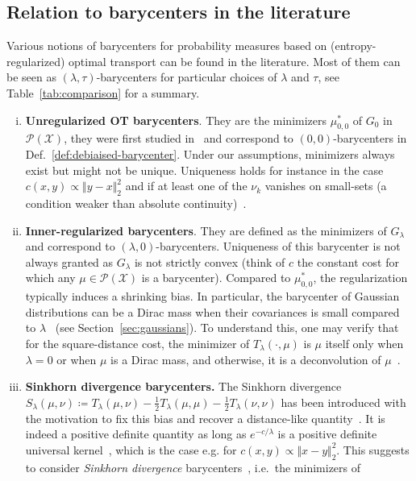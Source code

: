 \documentclass[11pt]{article}
\newcommand{\Pp}{\mathcal{P}}
\newcommand{\Xx}{\mathcal{X}}
\begin{document}
\subsection{Relation to barycenters in the literature}
Various notions of barycenters for probability measures based on (entropy-regularized) optimal transport can be found in the literature. Most of them can be seen as $(\lambda,\tau)$-barycenters for particular choices of $\lambda$ and $\tau$, see Table~\ref{tab:comparison} for a summary.
\begin{enumerate}[(i)]
\item \textbf{Unregularized OT barycenters}. They are the minimizers $\mu_{0,0}^*$ of $G_0$ in $\Pp(\Xx)$, they were first studied in~\cite{agueh2011barycenters} and correspond to $(0,0)$-barycenters in Def.~\ref{def:debiaised-barycenter}. Under our assumptions, minimizers always exist but might not be unique. Uniqueness holds for instance in the case $c(x,y)\propto \Vert y-x\Vert_2^2$ and if at least one of the $\nu_k$ vanishes on small-sets (a condition weaker than absolute continuity)~\cite{agueh2011barycenters}. 
\item \textbf{Inner-regularized barycenters}. They are defined as the minimizers of $G_\lambda$ and correspond to $(\lambda,0)$-barycenters. Uniqueness of this barycenter is not always granted as $G_\lambda$ is not strictly convex (think of $c$ the constant cost for which any $\mu\in\Pp(\Xx)$ is a barycenter). Compared to $\mu_{0,0}^*$, the regularization typically induces a shrinking bias. In particular, the barycenter of Gaussian distributions can be a Dirac mass when their covariances is small compared to $\lambda$~\cite{janati2020debiased} (see  Section~\ref{sec:gaussians}). To understand this, one may verify that for the square-distance cost, the minimizer of $T_\lambda(\cdot,\mu)$ is $\mu$ itself only when $\lambda=0$ or when $\mu$ is a Dirac mass, and otherwise, it is a deconvolution of $\mu$~\cite{rigollet2018entropic}. 
\item \textbf{Sinkhorn divergence barycenters.} The Sinkhorn divergence $
 S_{\lambda}(\mu,\nu) \coloneqq T_\lambda(\mu,\nu) - \frac12 T_\lambda(\mu,\mu)-\frac12 T_\lambda(\nu,\nu)
 $
has been introduced with the motivation to fix this bias and recover a distance-like quantity~\cite{ramdas2017wasserstein, genevay2018learning}. It is indeed a positive definite quantity as long as $e^{-c/\lambda}$ is a positive definite universal kernel~\cite{feydy2019interpolating}, which is the case e.g. for $c(x,y)\propto\Vert x-y\Vert^2_2$. This suggests to consider \emph{Sinkhorn divergence} barycenters~\cite{janati2020debiased}, i.e.~the minimizers of 

\end{enumerate}
\end{document}
